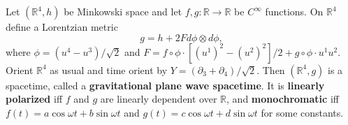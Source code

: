 Let $(\mathbb{R}^4, h)$ be Minkowski space and let $f, g: \mathbb{R} \to \mathbb{R}$ be $C^\infty$ functions. On $\mathbb{R}^4$ define a Lorentzian metric
$$g = h + 2F d\phi \otimes d\phi,$$
where $\phi = (u^4 - u^3)/\sqrt{2}$ and $F = f \circ \phi \cdot [(u^1)^2 - (u^2)^2]/2 + g \circ \phi \cdot u^1 u^2$. Orient $\mathbb{R}^4$ as usual and time orient by $Y = (\partial_3 + \partial_4)/\sqrt{2}$. Then $(\mathbb{R}^4, g)$ is a spacetime, called a \textbf{gravitational plane wave spacetime}. It is \textbf{linearly polarized} iff $f$ and $g$ are linearly dependent over $\mathbb{R}$, and \textbf{monochromatic} iff $f(t) = a\cos\omega t + b\sin\omega t$ and $g(t) = c\cos\omega t + d\sin\omega t$ for some constants.
